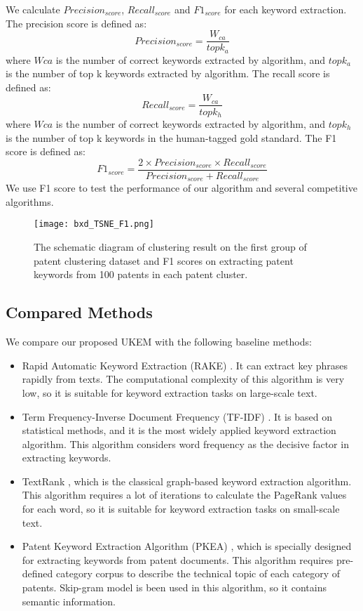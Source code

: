 \documentclass[conference]{IEEEtran}
\begin{document}
\begin{CJK}{UTF8}{gbsn}
	We calculate $Precision_{score}$, $Recall_{score} $ and $F1_{score} $ for each keyword extraction. The precision score is defined as:
	\begin{equation}
	Precision_{score}=\frac{W_{ca}}{topk_a}\label{eq4}
	\end{equation}
	where $W{ca}$ is the number of correct keywords extracted by algorithm, and $topk_a$ is the number of top k keywords extracted by algorithm. The recall score is defined as:
	\begin{equation}
	Recall_{score}=\frac{W_{ca}}{topk_h}\label{eq5}
	\end{equation}
	where $W{ca}$ is the number of correct keywords extracted by algorithm, and $topk_h$ is the number of top k keywords in the human-tagged gold standard. The F1 score is defined as:
	\begin{equation}
	F1_{score}=\frac{2\times Precision_{score}\times Recall_{score}}{Precision_{score}+Recall_{score}}\label{eq6}
	\end{equation}
	We use F1 score to test the performance of our algorithm and several competitive algorithms.
	\begin{figure*}[hb]
		\centering
		\texttt{[image: bxd\_TSNE\_F1.png]} 
		\caption{The schematic diagram of clustering result on the first group of patent clustering dataset and F1 scores on extracting patent keywords from 100 patents in each patent cluster.}
		\label{bxd_TSNE_F1}
	\end{figure*}
	\subsection{Compared Methods}
	We compare our proposed UKEM with the following baseline methods:
	\begin{itemize}
		\item Rapid Automatic Keyword Extraction (RAKE) \cite{b7}. It can extract key phrases rapidly from texts. The computational complexity of this algorithm is very low, so it is suitable for keyword extraction tasks on large-scale text.
		\item Term Frequency-Inverse Document Frequency (TF-IDF) \cite{b5}. It is based on statistical methods, and it is the most widely applied keyword extraction algorithm. This algorithm considers word frequency as the decisive factor in extracting keywords.
		\item TextRank \cite{b6}, which is the classical graph-based keyword extraction algorithm. This algorithm requires a lot of iterations to calculate the PageRank values for each word, so it is suitable for keyword extraction tasks on small-scale text.
		\item Patent Keyword Extraction Algorithm (PKEA) \cite{b8}, which is specially designed for extracting keywords from patent documents. This algorithm requires pre-defined category corpus to describe the technical topic of each category of patents. Skip-gram model is been used in this algorithm, so it contains semantic information.
	\end{itemize}

\end{CJK}
\end{document}
